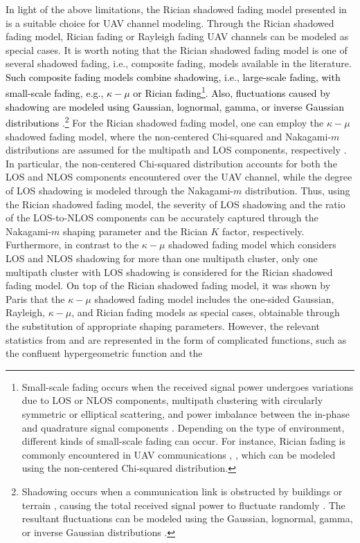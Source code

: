In light of the above limitations, the Rician shadowed fading model presented in \cite{tan2018ricianShad} is a suitable choice for UAV channel modeling. Through the Rician shadowed fading model, Rician fading or Rayleigh fading UAV channels \cite{ernest2018hybrid} can be modeled as special cases. It is worth noting that the Rician shadowed fading model is one of several shadowed fading, i.e., composite fading, models available in the literature. \textcolor{black}{Such composite fading models combine shadowing, i.e., large-scale fading, with small-scale fading, e.g., $\kappa - \mu$ or Rician fading\footnote{Small-scale fading occurs when the received signal power undergoes variations due to LOS or NLOS components, multipath clustering with circularly symmetric or elliptical scattering, and power imbalance between the in-phase and quadrature signal components \cite{chun2017comprehensive}. Depending on the type of environment, different kinds of small-scale fading can occur. For instance, Rician fading is commonly encountered in UAV communications \cite{matolak2017air_suburban}, \cite{sun2017air_hilly}, which can be modeled using the non-centered Chi-squared distribution.}. Also, fluctuations caused by shadowing are modeled using Gaussian, lognormal, gamma, or inverse Gaussian distributions \cite{al2014optimal,chun2017comprehensive}}.\footnote{Shadowing occurs when a communication link is obstructed by buildings or terrain \cite{matolak2015unmannedAircraft, matolak2012air, al2014optimal, chun2017comprehensive}, causing the total received signal power to fluctuate randomly \cite{chun2017comprehensive}. The resultant fluctuations can be modeled using the Gaussian, lognormal, gamma, or inverse Gaussian distributions \cite{al2014optimal, chun2017comprehensive}.} For the Rician shadowed fading model, one can employ the $\kappa - \mu$ shadowed fading model, where the non-centered Chi-squared and Nakagami-$m$ distributions are assumed for the multipath and LOS components, respectively \cite{chun2017comprehensive,paris2014statistical,zhang2017high,li2017effective}. In particular, the non-centered Chi-squared distribution accounts for both the LOS and NLOS components encountered over the UAV channel, while the degree of LOS shadowing is modeled through the Nakagami-$m$ distribution. Thus, using the Rician shadowed fading model, the severity of LOS shadowing and the ratio of the LOS-to-NLOS components can be accurately captured through the Nakagami-$m$ shaping parameter and the Rician $K$ factor, respectively. Furthermore, in contrast to the $\kappa - \mu$ shadowed fading model which considers LOS and NLOS shadowing for more than one multipath cluster, only one multipath cluster with LOS shadowing is considered for the Rician shadowed fading model. On top of the Rician shadowed fading model, it was shown by Paris \cite{paris2014statistical} that the $\kappa - \mu$ shadowed fading model includes the one-sided Gaussian, Rayleigh, $\kappa - \mu$, and Rician fading models as special cases, obtainable through the substitution of appropriate shaping parameters. However, the relevant statistics from \cite{chun2017comprehensive} and \cite{paris2014statistical} are represented in the form of complicated functions, such as the confluent hypergeometric function \cite{gradshteyn2014table} and the 